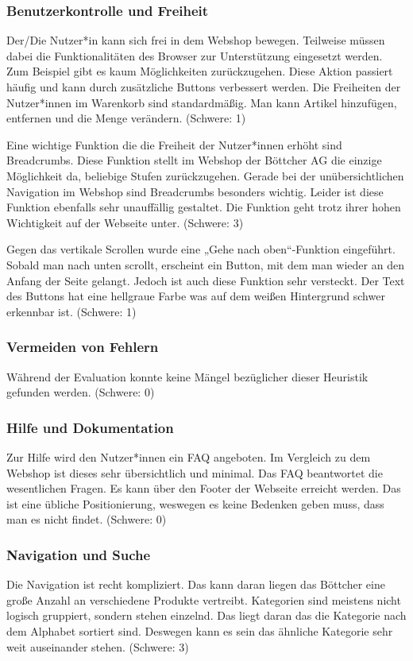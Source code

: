 \documentclass[utf8,biblatex]{lni}
\begin{document}
\subsubsection*{Benutzerkontrolle und Freiheit}
Der/Die Nutzer*in kann sich frei in dem Webshop bewegen. Teilweise müssen dabei die Funktionalitäten des Browser zur Unterstützung eingesetzt werden. Zum Beispiel gibt es kaum Möglichkeiten zurückzugehen. Diese Aktion passiert häufig und kann durch zusätzliche Buttons verbessert werden. Die Freiheiten der Nutzer*innen im Warenkorb sind standardmäßig. Man kann Artikel hinzufügen, entfernen und die Menge verändern. (Schwere: 1)

Eine wichtige Funktion die die Freiheit der Nutzer*innen erhöht sind Breadcrumbs. Diese Funktion stellt im Webshop der Böttcher AG die einzige Möglichkeit da, beliebige Stufen zurückzugehen. Gerade bei der unübersichtlichen Navigation im Webshop sind Breadcrumbs besonders wichtig. Leider ist diese Funktion ebenfalls sehr unauffällig gestaltet. Die Funktion geht trotz ihrer hohen Wichtigkeit auf der Webseite unter. (Schwere: 3)

Gegen das vertikale Scrollen wurde eine „Gehe nach oben“-Funktion eingeführt. Sobald man nach unten scrollt, erscheint ein Button, mit dem man wieder an den Anfang der Seite gelangt. Jedoch ist auch diese Funktion sehr versteckt. Der Text des Buttons hat eine hellgraue Farbe was auf dem weißen Hintergrund schwer erkennbar ist. (Schwere: 1)


\subsubsection*{Vermeiden von Fehlern}
Während der Evaluation konnte keine Mängel bezüglicher dieser Heuristik gefunden werden. (Schwere: 0)


\subsubsection*{Hilfe und Dokumentation}
Zur Hilfe wird den Nutzer*innen ein FAQ angeboten. Im Vergleich zu dem Webshop ist dieses sehr übersichtlich und minimal. Das FAQ beantwortet die wesentlichen Fragen. Es kann über den Footer der Webseite erreicht werden. Das ist eine übliche Positionierung, weswegen es keine Bedenken geben muss, dass man es nicht findet. (Schwere: 0)


\subsubsection*{Navigation und Suche}
Die Navigation ist recht kompliziert. Das kann daran liegen das Böttcher eine große Anzahl an verschiedene Produkte vertreibt. Kategorien sind meistens nicht logisch gruppiert, sondern stehen einzelnd. Das liegt daran das die Kategorie nach dem Alphabet sortiert sind. Deswegen kann es sein das ähnliche Kategorie sehr weit auseinander stehen. (Schwere: 3)
\end{document}
